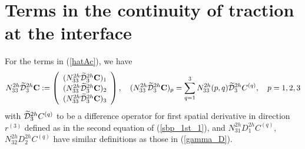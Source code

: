 \section{Terms in the continuity of traction at the interface}\label{traction_c}
For the terms in (\ref{hatAc}), we have
\begin{align*}
{N}_{33}^{2h}\widetilde{\mathcal{D}}_3^{2h}{\bf C} := \left(\begin{array}{c}
({N}_{33}^{2h}\widetilde{\mathcal{D}}_3^{2h}{\bf C})_1 \\
({N}_{33}^{2h}\widetilde{\mathcal{D}}_3^{2h}{\bf C})_2 \\
({N}_{33}^{2h}\widetilde{\mathcal{D}}_3^{2h}{\bf C})_3 
\end{array}\right), \quad ({N}_{33}^{2h}\widetilde{\mathcal{D}}_3^{2h}{\bf C})_p = \sum_{q = 1}^{3} N_{33}^{2h}(p,q)\widetilde{\mathcal{D}}_3^{2h}{C}^{(q)},\quad p = 1,2,3
\end{align*}
with $\widetilde{\mathcal{D}}_3^{2h}{C}^{(q)}$ to be a difference operator for first spatial derivative in direction $r^{(3)}$ defined as in the second equation of (\ref{sbp_1st_1}), and $N_{31}^{2h}{D}_1^{2h}{C}^{(q)}$, $N_{32}^{2h}{D}_2^{2h}{C}^{(q)}$ have similar definitions as those in (\ref{gamma_D}). 